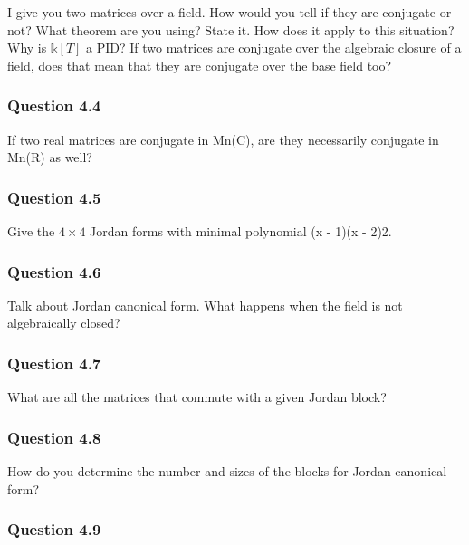 I give you two matrices over a field. How would you tell if they are
conjugate or not? What theorem are you using? State it. How does it
apply to this situation? Why is \({\mathbb{k}}[T]\) a PID? If two
matrices are conjugate over the algebraic closure of a field, does that
mean that they are conjugate over the base field too?

\hypertarget{question-4.4}{%
\subsubsection{Question 4.4}\label{question-4.4}}

If two real matrices are conjugate in Mn(C), are they necessarily
conjugate in Mn(R) as well?

\hypertarget{question-4.5}{%
\subsubsection{Question 4.5}\label{question-4.5}}

Give the \(4 \times 4\) Jordan forms with minimal polynomial (x - 1)(x -
2)2.

\hypertarget{question-4.6}{%
\subsubsection{Question 4.6}\label{question-4.6}}

Talk about Jordan canonical form. What happens when the field is not
algebraically closed?

\hypertarget{question-4.7}{%
\subsubsection{Question 4.7}\label{question-4.7}}

What are all the matrices that commute with a given Jordan block?

\hypertarget{question-4.8}{%
\subsubsection{Question 4.8}\label{question-4.8}}

How do you determine the number and sizes of the blocks for Jordan
canonical form?

\hypertarget{question-4.9}{%
\subsubsection{Question 4.9}\label{question-4.9}}

